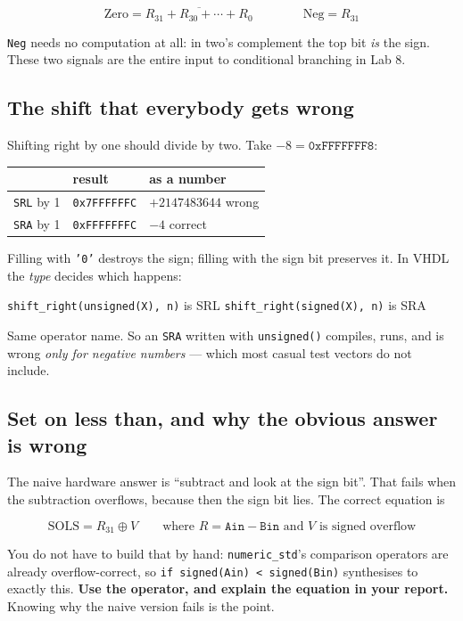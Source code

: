 \documentclass[11pt]{article}
\newcommand{\code}[1]{\texttt{#1}}
\begin{document}
\[
\text{Zero} = \overline{R_{31} + R_{30} + \cdots + R_0}
\qquad\qquad
\text{Neg} = R_{31}
\]

\code{Neg} needs no computation at all: in two's complement the top bit
\emph{is} the sign. These two signals are the entire input to conditional
branching in Lab 8.

\subsection*{The shift that everybody gets wrong}

Shifting right by one should divide by two. Take $-8 = \code{0xFFFFFFF8}$:

\begin{center}
\begin{tabular}{lll}
\toprule
& result & as a number \\
\midrule
\code{SRL} by 1 & \code{0x7FFFFFFC} & $+2147483644$ \quad wrong \\
\code{SRA} by 1 & \code{0xFFFFFFFC} & $-4$ \quad correct \\
\bottomrule
\end{tabular}
\end{center}

Filling with \code{'0'} destroys the sign; filling with the sign bit preserves
it. In VHDL the \emph{type} decides which happens:

\begin{center}
\code{shift\_right(unsigned(X), n)} is SRL \qquad
\code{shift\_right(signed(X), n)} is SRA
\end{center}

Same operator name. So an \code{SRA} written with \code{unsigned()} compiles,
runs, and is wrong \emph{only for negative numbers} --- which most casual test
vectors do not include.

\subsection*{Set on less than, and why the obvious answer is wrong}

The naive hardware answer is ``subtract and look at the sign bit''. That fails
when the subtraction overflows, because then the sign bit lies. The correct
equation is

\[
\text{SOLS} = R_{31} \oplus V \qquad \text{where } R = \code{Ain} - \code{Bin}
\text{ and } V \text{ is signed overflow}
\]

You do not have to build that by hand: \code{numeric\_std}'s comparison
operators are already overflow-correct, so \code{if signed(Ain) < signed(Bin)}
synthesises to exactly this. \textbf{Use the operator, and explain the equation
in your report.} Knowing why the naive version fails is the point.
\end{document}
